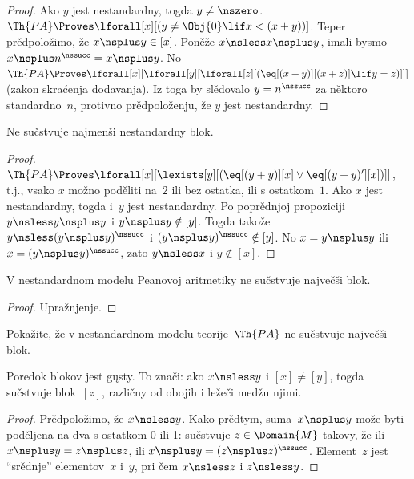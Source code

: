\documentclass[../../../include/open-logic-section]{subfiles}
\begin{document}
\begin{proof}
Ako $y$ jest nestandardny, togda $y \neq \nszero$. $\Th{PA} \Proves
\lforall[x][(y \neq \Obj{0} \lif x < (x+y))]$. Teper prědpoložimo,
že $x \nsplus y \in [x]$. Poněže $x \nsless x \nsplus y$, imali bysmo
$x \nsplus n^\nssucc = x \nsplus y$. No $\Th{PA} \Proves
\lforall[x][\lforall[y][\lforall[z][(\eq[(x+y)][(x+z)] \lif y = z)]]]$
(zakon skraćenja dodavanja). Iz toga by slědovalo $y = n^\nssucc$ za
něktoro standardno~$n$, protivno prědpoloženju, že $y$ jest
nestandardny.
\end{proof}

\begin{prop}
Ne sučstvuje najmenši nestandardny blok.
\end{prop}

\begin{proof}
$\Th{PA} \Proves \lforall[x][\lexists[y][(\eq[(y+y)][x] \lor
      \eq[(y+y)'][x])]]$, t.j., vsako $x$ možno poděliti na~$2$ ili
  bez ostatka, ili s ostatkom~$1$. Ako $x$ jest nestandardny, togda i~$y$
  jest nestandardny. Po poprědnjoj propoziciji $y \nsless y \nsplus y$
  i $y \nsplus y \notin [y]$. Togda takože $y \nsless (y \nsplus
  y)^\nssucc$ i $(y \nsplus y)^\nssucc \notin [y]$. No $x = y \nsplus
  y$ ili $x = (y \nsplus y)^\nssucc$, zato $y \nsless x$ i
  $y \notin [x]$.
\end{proof}

\begin{prop}
V nestandardnom modelu Peanovoj aritmetiky ne sučstvuje največši blok.
\end{prop}

\begin{proof}
Upražnjenje.
\end{proof}

\begin{prob}
Pokažite, že v nestandardnom modelu teorije~$\Th{PA}$ ne sučstvuje
največši blok.
\end{prob}

\begin{prop}
Poredok blokov jest gųsty. To znači: ako $x \nsless y$ i
$[x] \neq [y]$, togda sučstvuje blok~$[z]$, različny od obojih i
ležeči medžu njimi.
\end{prop}

\begin{proof}
Prědpoložimo, že $x \nsless y$. Kako prědtym, suma~$x \nsplus y$ može
byti poděljena na dva s ostatkom 0 ili 1: sučstvuje $z \in \Domain{M}$
takovy, že ili $x \nsplus y = z \nsplus z$, ili $x \nsplus y =
(z \nsplus z)^\nssucc$. Element~$z$ jest ``srědnje'' elementov~$x$ i~$y$,
pri čem $x \nsless z$ i $z \nsless y$.
\end{proof}
\end{document}
